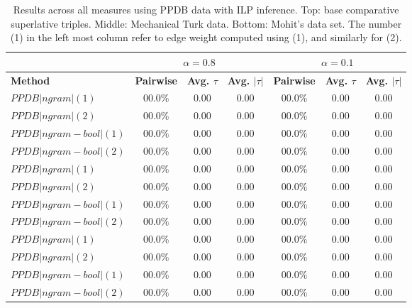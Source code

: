 \begin{table}
\small
\centering
\begin{tabular}{|l|ccc|ccc|}
	\hline 
	& \multicolumn{3}{c|}{$\alpha = 0.8$} & \multicolumn{3}{c|}{$\alpha = 0.1$} \\
	\hline 
	\bf Method 
	& \bf Pairwise & \bf Avg. $\tau$ & \bf Avg. $|\tau|$ 
	& \bf Pairwise & \bf Avg. $\tau$ & \bf Avg. $|\tau|$ \\ 
	\hline
	$PPDB|ngram     \lvert (1)$  & 00.0\% & 0.00 & 0.00 & 00.0\% & 0.00 & 0.00 \\
	$PPDB|ngram     \lvert (2)$  & 00.0\% & 0.00 & 0.00 & 00.0\% & 0.00 & 0.00 \\
	$PPDB|ngram-bool\lvert (1)$  & 00.0\% & 0.00 & 0.00 & 00.0\% & 0.00 & 0.00 \\
	$PPDB|ngram-bool\lvert (2)$  & 00.0\% & 0.00 & 0.00 & 00.0\% & 0.00 & 0.00 \\
	\hline
	\hline 
	$PPDB|ngram     \lvert (1)$  & 00.0\% & 0.00 & 0.00 & 00.0\% & 0.00 & 0.00 \\
	$PPDB|ngram     \lvert (2)$  & 00.0\% & 0.00 & 0.00 & 00.0\% & 0.00 & 0.00 \\
	$PPDB|ngram-bool\lvert (1)$  & 00.0\% & 0.00 & 0.00 & 00.0\% & 0.00 & 0.00 \\
	$PPDB|ngram-bool\lvert (2)$  & 00.0\% & 0.00 & 0.00 & 00.0\% & 0.00 & 0.00 \\
	\hline
	\hline
	$PPDB|ngram     \lvert (1)$  & 00.0\% & 0.00 & 0.00 & 00.0\% & 0.00 & 0.00 \\
	$PPDB|ngram     \lvert (2)$  & 00.0\% & 0.00 & 0.00 & 00.0\% & 0.00 & 0.00 \\
	$PPDB|ngram-bool\lvert (1)$  & 00.0\% & 0.00 & 0.00 & 00.0\% & 0.00 & 0.00 \\
	$PPDB|ngram-bool\lvert (2)$  & 00.0\% & 0.00 & 0.00 & 00.0\% & 0.00 & 0.00 \\
	\hline
\end{tabular}
\caption{\label{font-table} Results across all measures using PPDB data with ILP inference. Top: base comparative superlative triples. Middle: Mechanical Turk data. Bottom: Mohit's data set. The number (1) in the left most column refer to edge weight computed using (1), and similarly for (2). }
\end{table}





















